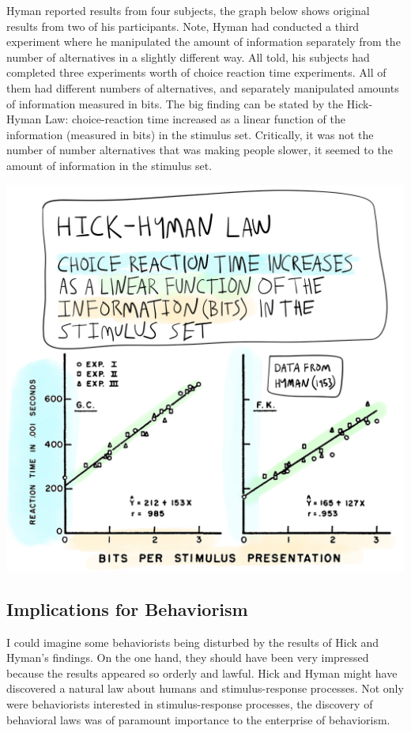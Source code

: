 \documentclass[
  oneside,
  12pt]{crumpbook}
\begin{document}
Hyman reported results from four subjects, the graph below shows original results from two of his participants. Note, Hyman had conducted a third experiment where he manipulated the amount of information separately from the number of alternatives in a slightly different way. All told, his subjects had completed three experiments worth of choice reaction time experiments. All of them had different numbers of alternatives, and separately manipulated amounts of information measured in bits. The big finding can be stated by the Hick-Hyman Law: choice-reaction time increased as a linear function of the information (measured in bits) in the stimulus set. Critically, it was not the number of number alternatives that was making people slower, it seemed to the amount of information in the stimulus set.

\begin{center}\includegraphics[width=1\linewidth]{imgs/Hick_hyman_law} \end{center}

\hypertarget{implications-for-behaviorism}{%
\subsection{Implications for Behaviorism}\label{implications-for-behaviorism}}

I could imagine some behaviorists being disturbed by the results of Hick and Hyman's findings. On the one hand, they should have been very impressed because the results appeared so orderly and lawful. Hick and Hyman might have discovered a natural law about humans and stimulus-response processes. Not only were behaviorists interested in stimulus-response processes, the discovery of behavioral laws was of paramount importance to the enterprise of behaviorism.
\end{document}
